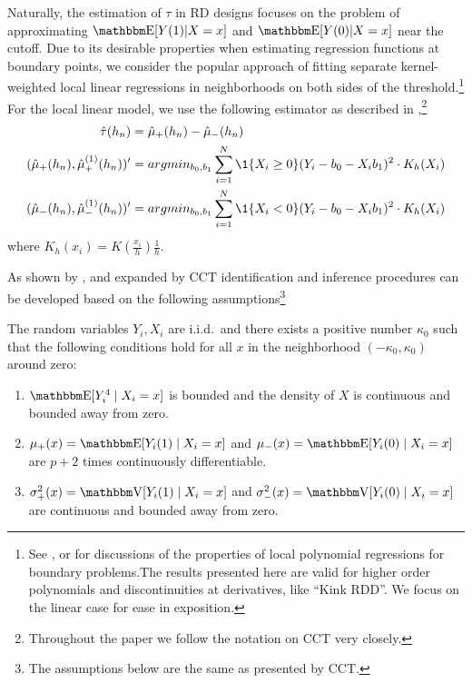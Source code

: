 \documentclass[12pt,fleqn]{article}
\begin{document}
Naturally, the estimation of $\tau$ in RD designs focuses on the 
problem of approximating $\E[Y(1)|X=x]$ and $\E[Y(0)|X=x]$
near the cutoff. Due to its desirable properties when estimating regression 
functions at boundary points, we consider the popular approach of fitting 
separate kernel-weighted local linear regressions in neighborhoods on both 
sides of the threshold.\footnote{See \cite{HTV2001}, \cite{Porter03} or
\cite{FanGijbels92} for discussions of the properties of local polynomial 
regressions for boundary problems.The results presented here are valid for
higher order polynomials and discontinuities at derivatives, like ``Kink RDD''. We focus on the linear case for ease in exposition.}
For the local linear model, we use the following estimator as described in 
\cite{calonico2014},\footnote{Throughout the paper we follow the
notation on CCT very closely.}
\begin{align*}
 \hat{\tau}(h_{n})&=\hat {\mu}_{+}(h_{n}) -\hat{\mu}_{-}(h_{n})\\
(\hat {\mu}_{+}(h_{n}),\hat {\mu}^{(1)}_{+}(h_{n}))'&= argmin_{b_{0},b_{1}} 
\sum_{i=1}^{N}\1\{X_{i} \geq 0\}(Y_{i}-b_{0}-X_{i}b_{1})^{2} \cdot K_{h}(X_{i})\\
(\hat {\mu}_{-}(h_{n}),\hat {\mu}^{(1)}_{-}(h_{n}))' &= argmin_{b_{0},b_{1}}
\sum_{i=1}^{N}\1\{X_{i} < 0\}(Y_{i}-b_{0}-X_{i}b_{1})^{2}\cdot K_{h}(X_{i})
\end{align*}
where $K_{h}(x_{i}) = K\left(\frac{x_{i}}{h}\right)\frac{1}{h}$.

As shown by \cite{HTV2001}, \cite{Porter03} and expanded by CCT identification and inference procedures can be developed based on the following assumptions\footnote{The assumptions below are the same as presented by CCT.}

\begin{assumption}\label{A1}
  The random variables $Y_i, X_i$ are i.i.d.\ and
  there exists a positive number $\kappa_0$ such that the following
  conditions hold for all $x$ in the neighborhood
  $(-\kappa_{0},\kappa_{0})$ around zero:
  \begin{enumerate}
  \item $\E[Y_{i}^{4} \mid X_{i}=x]$ is bounded and the density of $X$
    is continuous and bounded away from zero.
  \item $\mu_{+}(x) = \E[ Y_{i}(1) \mid X_{i}=x ]$ and
    $\mu_{-}(x) = \E[ Y_{i}(0) \mid X_{i}=x ]$ are $p+2$ times
    continuously differentiable.
  \item $\sigma^{2}_{+}(x)=\V[ Y_{i}(1) \mid X_{i}=x ]$ and
    $\sigma^{2}_{-}(x)=\V[ Y_{i}(0) \mid X_{i}=x ]$ are continuous and
    bounded away from zero.
 \end{enumerate}
\end{assumption}
\end{document}
